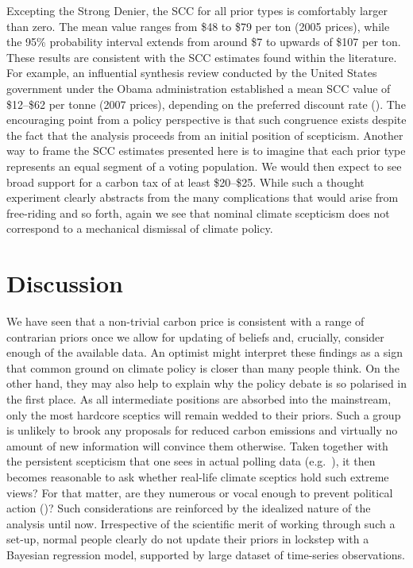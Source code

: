 \documentclass[smallextended]{svjour3}       %
\begin{document}
Excepting the Strong Denier, the SCC for all prior types is comfortably
larger than zero. The mean value ranges from \$48 to \$79 per ton (2005
prices), while the 95\% probability interval extends from around \$7 to
upwards of \$107 per ton. These results are consistent with the SCC
estimates found within the literature. For example, an influential
synthesis review conducted by the United States government under the
Obama administration established a mean SCC value of \$12--\$62 per
tonne (2007 prices), depending on the preferred discount rate
(\cite{iwg2016scc}). The encouraging point from a policy perspective is
that such congruence exists despite the fact that the analysis proceeds
from an initial position of scepticism. Another way to frame the SCC
estimates presented here is to imagine that each prior type represents
an equal segment of a voting population. We would then expect to see
broad support for a carbon tax of at least \$20--\$25. While such a
thought experiment clearly abstracts from the many complications that
would arise from free-riding and so forth, again we see that nominal
climate scepticism does not correspond to a mechanical dismissal of
climate policy.

\hypertarget{sec:discussion}{%
\section{Discussion}\label{sec:discussion}}

We have seen that a non-trivial carbon price is consistent with a range
of contrarian priors once we allow for updating of beliefs and,
crucially, consider enough of the available data. An optimist might
interpret these findings as a sign that common ground on climate policy
is closer than many people think. On the other hand, they may also help
to explain why the policy debate is so polarised in the first place. As
all intermediate positions are absorbed into the mainstream, only the
most hardcore sceptics will remain wedded to their priors. Such a group
is unlikely to brook any proposals for reduced carbon emissions and
virtually no amount of new information will convince them otherwise.
Taken together with the persistent scepticism that one sees in actual
polling data (e.g.~\cite{saad2019americans}), it then becomes reasonable
to ask whether real-life climate sceptics hold such extreme views? For
that matter, are they numerous or vocal enough to prevent political
action (\cite{lewandowsky2019influence})? Such considerations are
reinforced by the idealized nature of the analysis until now.
Irrespective of the scientific merit of working through such a set-up,
normal people clearly do not update their priors in lockstep with a
Bayesian regression model, supported by large dataset of time-series
observations.
\end{document}
